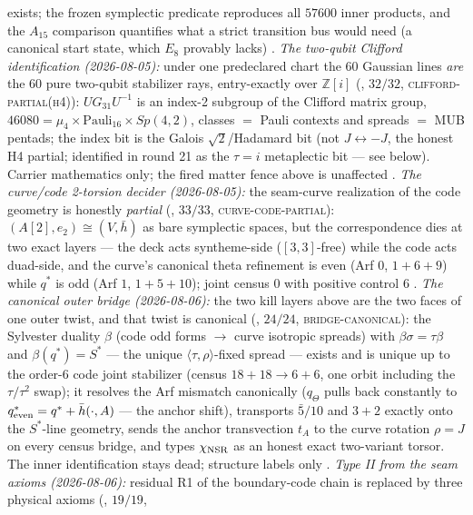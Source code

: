 \documentclass[11pt,a4paper]{article}
\newcommand{\Z}{\mathbb{Z}}
\theoremstyle{definition}
\begin{document}
\begin{keybox}
exists; the frozen symplectic predicate reproduces all $57600$
inner products, and the $A_{15}$ comparison quantifies what a
strict transition bus would need (a canonical start state, which
$E_8$ provably lacks) \mE.
\emph{The two-qubit Clifford identification (2026-08-05):} under
one predeclared chart the $60$ Gaussian lines \emph{are} the $60$
pure two-qubit stabilizer rays, entry-exactly over $\Z[i]$
(, $32/32$,
\textsc{clifford-partial(h4)}): $UG_{31}U^{-1}$ is an index-2
subgroup of the Clifford matrix group,
$46080=\mu_4\times\mathrm{Pauli}_{16}\times Sp(4,2)$, classes $=$
Pauli contexts and spreads $=$ MUB pentads; the index bit is the
Galois $\sqrt2$/Hadamard bit (not $J\leftrightarrow-J$, the honest
H4 partial; identified in round 21 as the $\tau=i$ metaplectic bit
--- see below).  Carrier mathematics only; the fired matter fence
above is unaffected \mE.
\emph{The curve/code 2-torsion decider (2026-08-05):} the
seam-curve realization of the code geometry is honestly
\emph{partial}
(, $33/33$,
\textsc{curve-code-partial}): $(A[2],e_2)\cong(V,\bar h)$ as bare
symplectic spaces, but the correspondence dies at two exact layers
--- the deck acts syntheme-side ($[3,3]$-free) while the code acts
duad-side, and the curve's canonical theta refinement is even
(Arf $0$, $1{+}6{+}9$) while $q^{*}$ is odd (Arf $1$,
$1{+}5{+}10$); joint census $0$ with positive control $6$ \mE.
\emph{The canonical outer bridge (2026-08-06):} the two kill
layers above are the two faces of one outer twist, and that twist
is canonical
(, $24/24$,
\textsc{bridge-canonical}): the Sylvester duality $\beta$ (code odd
forms $\to$ curve isotropic spreads) with
$\beta\sigma=\tau\beta$ and $\beta(q^{*})=S^{*}$ --- the unique
$\langle\tau,\rho\rangle$-fixed spread --- exists and is unique up
to the order-6 code joint stabilizer (census $18+18\to6+6$, one
orbit including the $\tau/\tau^2$ swap); it resolves the Arf
mismatch canonically ($q_{\Theta}$ pulls back constantly to
$q^{*}_{\rm even}=q^{*}+\bar h(\cdot,A)$ --- the anchor shift),
transports $\bar5/10$ and $3{+}2$ exactly onto the $S^{*}$-line
geometry, sends the anchor transvection $t_A$ to the curve
rotation $\rho=J$ on every census bridge, and types
$\chi_{\rm NSR}$ as an honest exact two-variant torsor.  The inner
identification stays dead; structure labels only \mE.
\emph{Type II from the seam axioms (2026-08-06):} residual R1 of
the boundary-code chain is replaced by three physical axioms
(, $19/19$,

\end{keybox}
\end{document}
